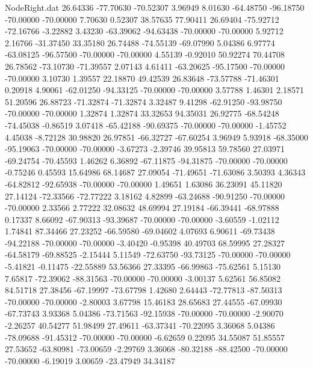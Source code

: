 \begin{filecontents}{NodeRight.dat}
  26.64336  -77.70630  -70.52307     3.96949    8.01630  -64.48750  -96.18750  -70.00000  -70.00000    7.70630    0.52307   38.57635   77.90411
  26.69404  -75.92712  -72.16766    -3.22882    3.43230  -63.39062  -94.63438  -70.00000  -70.00000    5.92712    2.16766  -31.37450   33.35180
  26.74488  -74.55139  -69.07990     5.04386    6.97774  -63.08125  -96.57500  -70.00000  -70.00000    4.55139   -0.92010   50.92274   70.44708
  26.78562  -73.10730  -71.39557     2.07143    4.61411  -63.20625  -95.17500  -70.00000  -70.00000    3.10730    1.39557   22.18870   49.42539
  26.83648  -73.57788  -71.46301     0.20918    4.90061  -62.01250  -94.33125  -70.00000  -70.00000    3.57788    1.46301    2.18571   51.20596
  26.88723  -71.32874  -71.32874     3.32487    9.41298  -62.91250  -93.98750  -70.00000  -70.00000    1.32874    1.32874   33.32653   94.35031
  26.92775  -68.54248  -74.45038    -0.86519    3.07418  -65.42188  -90.69375  -70.00000  -70.00000   -1.45752    4.45038   -8.72128   30.98820
  26.97851  -66.32727  -67.60254     3.96949    5.93918  -68.35000  -95.19063  -70.00000  -70.00000   -3.67273   -2.39746   39.95813   59.78560
  27.03971  -69.24754  -70.45593     1.46262    6.36892  -67.11875  -94.31875  -70.00000  -70.00000   -0.75246    0.45593   15.64986   68.14687
  27.09054  -71.49651  -71.63086     3.50393    4.36343  -64.82812  -92.65938  -70.00000  -70.00000    1.49651    1.63086   36.23091   45.11820
  27.14124  -72.33566  -72.77222     3.18162    4.82899  -63.24688  -90.91250  -70.00000  -70.00000    2.33566    2.77222   32.08632   48.69994
  27.19184  -66.39441  -68.97888     0.17337    8.66092  -67.90313  -93.39687  -70.00000  -70.00000   -3.60559   -1.02112    1.74841   87.34466
  27.23252  -66.59580  -69.04602     4.07693    6.90611  -69.73438  -94.22188  -70.00000  -70.00000   -3.40420   -0.95398   40.49703   68.59995
  27.28327  -64.58179  -69.88525    -2.15444    5.11549  -72.63750  -93.73125  -70.00000  -70.00000   -5.41821   -0.11475  -22.55889   53.56366
  27.33395  -66.99863  -75.62561     5.15130    7.65817  -72.39062  -88.31563  -70.00000  -70.00000   -3.00137    5.62561   56.85082   84.51718
  27.38456  -67.19997  -73.67798     1.42680    2.64443  -72.77813  -87.50313  -70.00000  -70.00000   -2.80003    3.67798   15.46183   28.65683
  27.44555  -67.09930  -67.73743     3.93368    5.04386  -73.71563  -92.15938  -70.00000  -70.00000   -2.90070   -2.26257   40.54277   51.98499
  27.49611  -63.37341  -70.22095     3.36068    5.04386  -78.09688  -91.45312  -70.00000  -70.00000   -6.62659    0.22095   34.55087   51.85557
  27.53652  -63.80981  -73.00659    -2.29769    3.36068  -80.32188  -88.42500  -70.00000  -70.00000   -6.19019    3.00659  -23.47949   34.34187

\end{filecontents}
